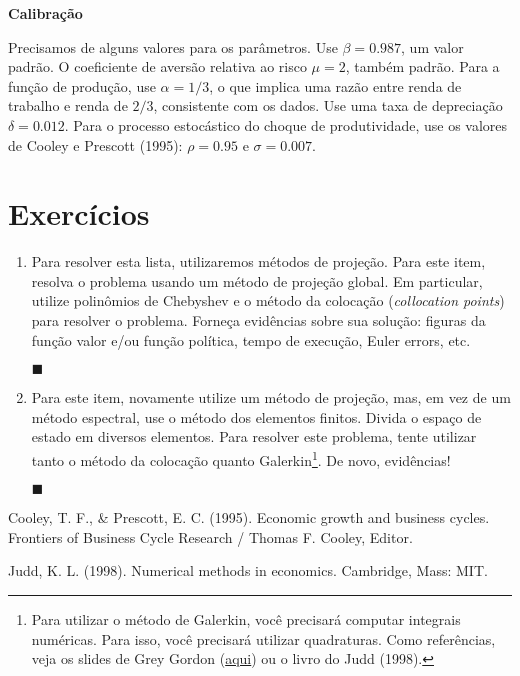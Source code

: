\documentclass[10pt]{article}
\newcommand*{\QEDA}{\hfill\ensuremath{\blacksquare}}%
\newcommand\0{\mathbf{0}}
\newcounter{exercise}
\newcounter{problem}[exercise]
\newenvironment{sol}
    {\\[1em] {\color{magenta}\text{Resposta.}}
    }
    {{\color{blue!50!black}\QEDA}}
\begin{document}
\textbf{Calibração}

Precisamos de alguns valores para os parâmetros. Use $\beta = 0.987$, um valor padrão. O coeficiente de aversão relativa ao risco $\mu = 2$, também padrão. Para a função de produção, use $\alpha = 1/3$, o que implica uma razão entre renda de trabalho e renda de $2/3$, consistente com os dados. Use uma taxa de depreciação $\delta = 0.012$. Para o processo estocástico do choque de produtividade, use os valores de Cooley e Prescott (1995): $\rho = 0.95$ e $\sigma = 0.007$.

\newpage

\section*{Exercícios}

\begin{enumerate}[wide, label = \arabic*.]

\item Para resolver esta lista, utilizaremos métodos de projeção. Para este item, resolva o problema usando um método de projeção global. Em
particular, utilize polinômios de Chebyshev e o método da colocação
(\textit{collocation points}) para resolver o problema. Forneça evidências sobre sua solução: figuras da função valor e/ou função política, tempo de
execução, Euler errors, etc.
\begin{sol}

\end{sol}


\item Para este item, novamente utilize um método de projeção, mas, em vez
de um método espectral, use o método dos elementos finitos. Divida o
espaço de estado em diversos elementos. Para resolver este problema,
tente utilizar tanto o método da colocação quanto Galerkin\footnote{ Para utilizar o método de Galerkin, você precisará computar integrais numéricas. Para isso, você precisará utilizar quadraturas. Como referências, veja os slides de Grey Gordon (\href{https://sites.google.com/site/greygordon/teaching}{aqui}) ou o livro do Judd (1998).}. De novo, evidências!
\begin{sol}

\end{sol}

\end{enumerate}



\begin{thebibliography}{100} 

 Cooley, T. F., \& Prescott, E. C. (1995). Economic growth and business cycles. Frontiers of Business Cycle Research / Thomas F. Cooley, Editor.

 Judd, K. L. (1998). Numerical methods in economics. Cambridge, Mass: MIT.

\end{thebibliography}
\end{document}
